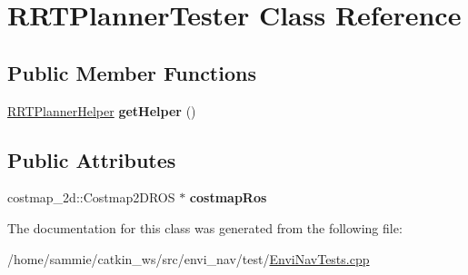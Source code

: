 \hypertarget{classRRTPlannerTester}{}\section{R\+R\+T\+Planner\+Tester Class Reference}
\label{classRRTPlannerTester}
\subsection*{Public Member Functions}
\begin{DoxyCompactItemize}
\item 
\hyperlink{classRRTPlannerHelper}{R\+R\+T\+Planner\+Helper} {\bfseries get\+Helper} ()\hypertarget{classRRTPlannerTester_af2bf60de841e92af66a7440831916886}{}\label{classRRTPlannerTester_af2bf60de841e92af66a7440831916886}

\end{DoxyCompactItemize}
\subsection*{Public Attributes}
\begin{DoxyCompactItemize}
\item 
costmap\+\_\+2d\+::\+Costmap2\+D\+R\+OS $\ast$ {\bfseries costmap\+Ros}\hypertarget{classRRTPlannerTester_af23925ac3623b7f6e831e519e861091a}{}\label{classRRTPlannerTester_af23925ac3623b7f6e831e519e861091a}

\end{DoxyCompactItemize}


The documentation for this class was generated from the following file\+:\begin{DoxyCompactItemize}
\item 
/home/sammie/catkin\+\_\+ws/src/envi\+\_\+nav/test/\hyperlink{EnviNavTests_8cpp}{Envi\+Nav\+Tests.\+cpp}\end{DoxyCompactItemize}

